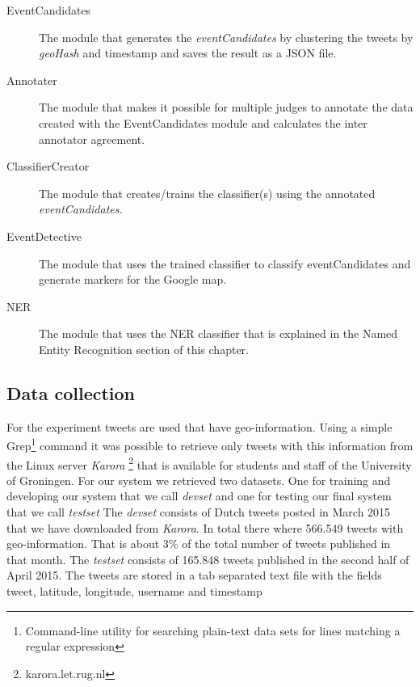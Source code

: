 \documentclass[
10pt, %
a4paper, %
oneside, %
headinclude,footinclude, %
BCOR5mm, %
]{scrartcl}
\begin{document}
\begin{description}

\item[EventCandidates] 
The module that generates the \textit{eventCandidates} by clustering the tweets by \textit{geoHash} and timestamp and saves the result as a JSON file.  

\item[Annotater] 
The module that makes it possible for multiple judges to annotate the data created with the EventCandidates module and calculates the inter annotator agreement. 

\item[ClassifierCreator] 
The module that creates/trains the classifier(s) using the annotated \textit{eventCandidates.}

\item[EventDetective] 
The module that uses the trained classifier to classify eventCandidates and generate markers for the Google map.

\item[NER]
The module that uses the NER classifier that is explained in the Named Entity Recognition section of this chapter.  

\end{description}

\newpage
\subsection{Data collection}
For the experiment tweets are used that have geo-information. Using a simple Grep\footnote{Command-line utility for searching plain-text data sets for lines matching a regular expression } command it was possible to retrieve only tweets with this information from the Linux server \textit{Karora} \footnote{karora.let.rug.nl} that is available for students and staff of the University of Groningen. For our system we retrieved two datasets. One for training and developing our system that we call \textit{devset} and one for testing our final system that we call \textit{testset}
The \textit{devset} consists of Dutch tweets posted in March 2015 that we have downloaded from \textit{Karora}. In total there where 566.549 tweets with geo-information. That is about 3\% of the total number of tweets published in that month. The \textit{testset} consists of 165.848 tweets published in the second half of April 2015. The tweets are stored in a tab separated text file with the fields tweet, latitude, longitude, username and timestamp
\end{document}
